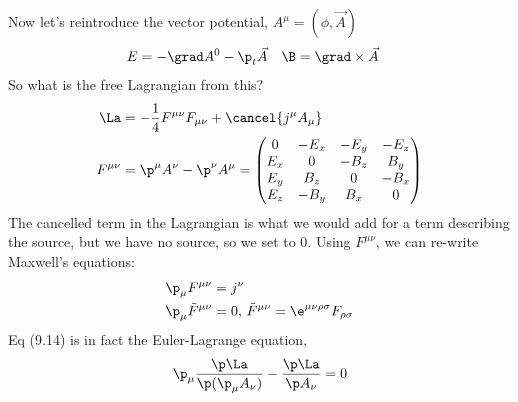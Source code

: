 \documentclass[a4paper, 11pt, normalem]{report}
\begin{document}
Now let's reintroduce the vector potential, $A^\mu = (\phi,\vec{A})$
\begin{align}
    E &= -\grad A^0 - \p_t\vec{A} & \B &= \grad\times\vec{A}
\end{align}
So what is the free Lagrangian from this?
\begin{align}
    \La &= -\frac14F^{\mu\nu}F_{\mu\nu} + \cancel{j^\mu A_\mu} \\
    F^{\mu\nu} &= \p^\mu A^\nu - \p^\nu A^\mu = \begin{pmatrix} 0 & -E_x & -E_y & -E_z \\ E_x & 0 & -B_z & B_y \\ E_y & B_z & 0 & -B_x \\ E_z & -B_y & B_x & 0 \end{pmatrix}
\end{align}
The cancelled term in the Lagrangian is what we would add for a term describing the source, but we have no source, so we set to 0.
Using $F^{\mu\nu}$, we can re-write Maxwell's equations:
\begin{align}
    \p_\mu F^{\mu\nu} &= j^\nu \\
    \p_\mu \tilde{F}^{\mu\nu} &= 0,\, \tilde{F}^{\mu\nu} = \e^{\mu\nu\rho\sigma}F_{\rho\sigma}
\end{align}
Eq (9.14) is in fact the Euler-Lagrange equation,
\begin{align}
    \p_\mu\frac{\p\La}{\p(\p_\mu A_\nu)} - \frac{\p\La}{\p A_\nu} = 0
\end{align}
\end{document}
